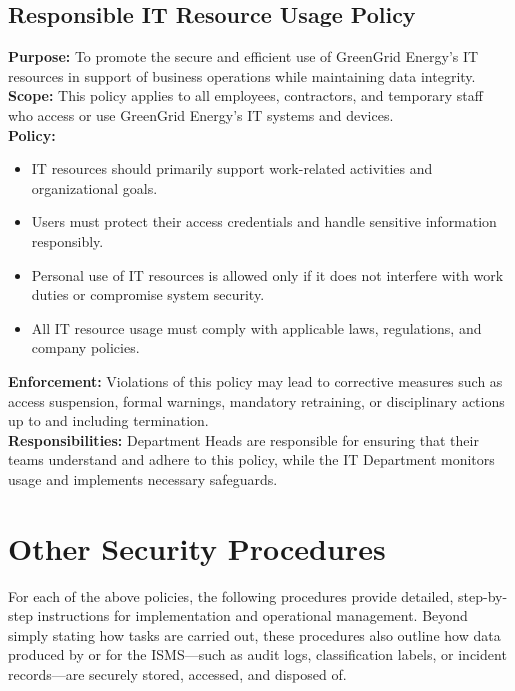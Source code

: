 \subsection{Responsible IT Resource Usage Policy}
\textbf{Purpose:} To promote the secure and efficient use of GreenGrid Energy’s IT resources in support 
of business operations while maintaining data integrity.\\[1mm]
\textbf{Scope:} This policy applies to all employees, contractors, and temporary staff who access or use 
GreenGrid Energy's \ac{IT} systems and devices.\\[1mm]
\textbf{Policy:}
\begin{itemize}
    \item \ac{IT} resources should primarily support work-related activities and organizational goals.
    \item Users must protect their access credentials and handle sensitive information responsibly.
    \item Personal use of \ac{IT} resources is allowed only if it does not interfere with work duties or compromise system security.
    \item All \ac{IT} resource usage must comply with applicable laws, regulations, and company policies.
\end{itemize}
\textbf{Enforcement:} Violations of this policy may lead to corrective measures such as access suspension, 
formal warnings, mandatory retraining, or disciplinary actions up to and including termination.\\[1mm]
\textbf{Responsibilities:} Department Heads are responsible for ensuring that their teams understand and adhere to 
this policy, while the \ac{IT} Department monitors usage and implements necessary safeguards.

\section{Other Security Procedures}
\label{sec:extra_procedures}

For each of the above policies, the following procedures provide 
detailed, step-by-step instructions for implementation and operational 
management. Beyond simply stating how tasks are carried out, these 
procedures also outline how data produced by or for the \ac{ISMS}—such 
as audit logs, classification labels, or incident records—are securely 
stored, accessed, and disposed of.

